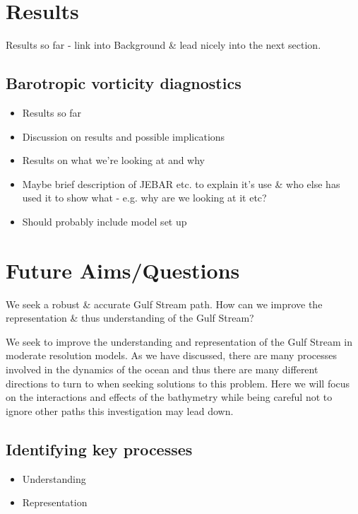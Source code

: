 \documentclass[a4paper,11pt]{article}
\begin{document}
\section{Results}

Results so far - link into Background \& lead nicely into the next section.
\subsection{Barotropic vorticity diagnostics}
\begin{itemize}
  \item Results so far
  \item Discussion on results and possible implications
  \item Results on what we're looking at and why
  \item Maybe brief description of JEBAR etc. to explain it's use \& who else has used it to show what - e.g. why are we looking at it etc?
  \item Should probably include model set up
\end{itemize}



\section{Future Aims/Questions}

We seek a robust \& accurate Gulf Stream path. How can we improve the representation \& thus understanding of the Gulf Stream?

We seek to improve the understanding and representation of the Gulf Stream in moderate resolution models. As we have discussed, there are many processes involved in the dynamics of the ocean and thus there are many different directions to turn to when seeking solutions to this problem. Here we will focus on the interactions and effects of the bathymetry while being careful not to ignore other paths this investigation may lead down. 

\subsection{Identifying key processes}
\begin{itemize}
  \item Understanding
  \item Representation
\end{itemize}
\end{document}
